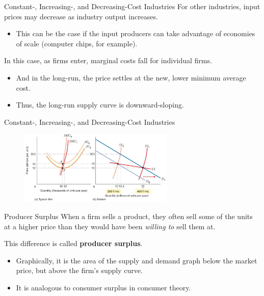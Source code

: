 \documentclass[11pt,t]{beamer}
\begin{document}
\begin{frame}{Constant-, Increasing-, and Decreasing-Cost Industries}
  For other industries, input prices may decrease as industry output increases.

  \begin{itemize}
    \item This can be the case if the input producers can take advantage of economies of scale (computer chips, for example).
  \end{itemize}

  \bigskip
  In this case, as firms enter, marginal costs fall for individual firms.

  \begin{itemize}
    \item And in the long-run, the price settles at the new, lower minimum average cost.
    
    \item Thus, the long-run supply curve is downward-sloping.
  \end{itemize}

\end{frame}

\begin{frame}{Constant-, Increasing-, and Decreasing-Cost Industries}
  \begin{figure}
    \includegraphics[width=280px]{figures/fig9_19.jpg}
  \end{figure}
\end{frame}

\begin{frame}{Producer Surplus}
  When a firm sells a product, they often sell some of the units at a higher price than they would have been \textit{willing to} sell them at.

  \bigskip
  This difference is called \textbf{producer surplus}.

  \begin{itemize}
    \item Graphically, it is the area of the supply and demand graph below the market price, but above the firm's supply curve.
    
    \item It is analogous to consumer surplus in consumer theory.
  \end{itemize}

\end{frame}
\end{document}

